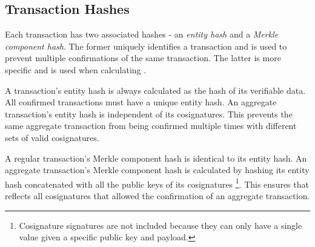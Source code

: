 \subsection{Transaction Hashes}

Each transaction has two associated hashes - an \emph{entity hash} and a \emph{Merkle component hash}.
The former uniquely identifies a transaction and is used to prevent multiple confirmations of the same transaction.
The latter is more specific and is used when calculating  .

A transaction's entity hash is always calculated as the hash of its verifiable data.
All confirmed transactions must have a unique entity hash.
An aggregate transaction's entity hash is independent of its cosignatures.
This prevents the same aggregate transaction from being confirmed multiple times with different sets of valid cosignatures.

A regular transaction's Merkle component hash is identical to its entity hash.
An aggregate transaction's Merkle component hash is calculated by hashing its entity hash concatenated with all the public keys of its cosignatures
\footnote{Cosignature signatures are not included because they can only have a single value given a specific public key and payload.}.
This ensures that  reflects all cosignatures that allowed the confirmation of an aggregate transaction.
